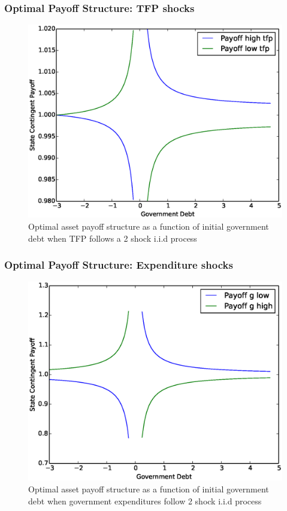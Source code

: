 \documentclass{beamer}
\begin{document}
  \begin{frame}
   \frametitle{Optimal Payoff Structure: TFP shocks}
	\begin{figure}
		\begin{center}
		\includegraphics[scale=.4]{Images/p_graph_tfp.eps}
		\caption{Optimal asset payoff structure as a function of initial government debt when TFP follows a 2 shock i.i.d process}
	\end{center}	
	\end{figure}

  \end{frame}

% 
  \begin{frame}
   \frametitle{Optimal Payoff Structure: Expenditure shocks}
	\begin{figure}
		\begin{center}
		\includegraphics[scale=.4]{Images/p_graph.eps}
		\caption{Optimal asset payoff structure as a function of initial government debt when government expenditures follow 2 shock i.i.d process}
	\end{center}	
	\end{figure}

  \end{frame}
% 
% 
\end{document}
